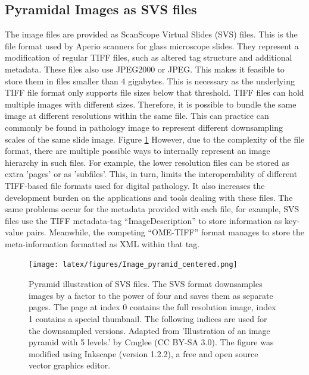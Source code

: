 \subsection{Pyramidal Images as SVS files}

The image files are provided as ScanScope Virtual Slides (SVS) files. This is the file format used by Aperio scanners for glass microscope slides. They represent a modification of regular TIFF files, such as altered tag structure and additional metadata. These files also use JPEG2000 or JPEG. This makes it feasible to store them in files smaller than 4 gigabytes. This is necessary as the underlying TIFF file format only supports file sizes below that threshold. \cite{AperioTechnologies2008Digital} TIFF files can hold multiple images with different sizes. Therefore, it is possible to bundle the same image at different resolutions within the same file. \cite{Aldus1992TIFF} 
This can practice can commonly be found in pathology image to represent different downsampling scales of the same slide image. Figure \ref{fig:pyramid}
However, due to the complexity of the file format, there are multiple possible ways to internally represent an image hierarchy in such files. \cite{Aldus1992TIFF} 
For example, the lower resolution files can be stored as extra 'pages' or as 'subfiles'.
This, in turn, limits the interoperability of different TIFF-based file formats used for digital pathology. It also increases the development burden on the applications and tools dealing with these files. The same problems occur for the metadata provided with each file, for example, SVS files use the TIFF metadata-tag “ImageDescription” to store information as key-value pairs. \cite{AperioTechnologies2008Digital} Meanwhile, the competing “OME-TIFF” format manages to store the meta-information formatted as XML within that tag. \cite{OpenMicroscopyEnvironment2022OME} 

\begin{figure}[h!t]
    \centering
    \texttt{[image: latex/figures/Image\_pyramid\_centered.png]}
    \caption[Pyramid representation of TIFF files]{Pyramid illustration of SVS files. The SVS format downsamples images by a factor to the power of four and saves them as separate pages. The page at index 0 contains the full resolution image, index 1 contains a special thumbnail. The following indices are used for the downsampled versions. Adapted from 'Illustration of an image pyramid with 5 levels.' by Cmglee (CC BY-SA 3.0). \cite{CreativeCommons2007Attribution, Cmglee2015Illustration} The figure was modified using Inkscape (version 1.2.2), a free and open source vector graphics editor. \cite{InkscapeTeam2022Inkscape}}
    \label{fig:pyramid}
\end{figure}

